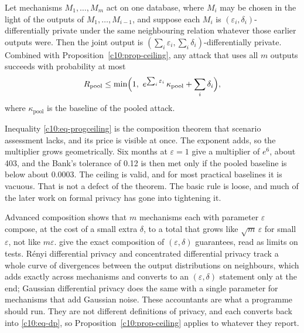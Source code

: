 \begin{proposition}\label{c10:prop-comp}
Let mechanisms $M_1,\dots,M_m$ act on one database, where $M_i$ may be
chosen in the light of the outputs of $M_1,\dots,M_{i-1}$, and suppose each $M_i$
is $(\varepsilon_i,\delta_i)$-differentially private under the same neighbouring
relation whatever those earlier outputs were. Then the joint output is
$(\sum_i \varepsilon_i, \sum_i \delta_i)$-differentially private. Combined with
Proposition~\ref{c10:prop-ceiling}, any attack that uses all $m$ outputs succeeds
with probability at most
\begin{equation}\label{c10:eq-progceiling}
R_{\mathrm{pool}} \le \min\Bigl(1,\ e^{\sum_i \varepsilon_i}\,\kappa_{\mathrm{pool}} + \sum_i \delta_i\Bigr),
\end{equation}
where $\kappa_{\mathrm{pool}}$ is the baseline of the pooled attack.
\end{proposition}

Inequality \eqref{c10:eq-progceiling} is the composition theorem that scenario
assessment lacks, and its price is visible at once. The exponent adds, so the
multiplier grows geometrically. Six months at $\varepsilon = 1$ give a multiplier
of $e^6$, about 403, and the Bank's tolerance of 0.12 is then met only if the
pooled baseline is below about 0.0003.
The ceiling is valid, and for most practical baselines it is vacuous. That is not
a defect of the theorem. The basic rule is loose, and much of the later work on
formal privacy has gone into tightening it.

Advanced composition \citep{dwork2010} shows that $m$ mechanisms each with
parameter $\varepsilon$ compose, at the cost of a small extra $\delta$, to a total
that grows like $\sqrt{m}\,\varepsilon$ for small $\varepsilon$, not like
$m\varepsilon$. \citet{kairouz2017} give the exact composition of
$(\varepsilon,\delta)$ guarantees, read as limits on tests. Rényi differential
privacy \citep{mironov2017} and concentrated differential privacy
\citep{bun2016} track a whole curve of divergences between the output
distributions on neighbours, which adds exactly across mechanisms and converts to
an $(\varepsilon,\delta)$ statement only at the end; Gaussian differential privacy
\citep{dong2022} does the same with a single parameter for mechanisms that add
Gaussian noise. These accountants are what a programme should run. They are not
different definitions of privacy, and each converts back into
\eqref{c10:eq-dp}, so Proposition~\ref{c10:prop-ceiling} applies to whatever they
report.

